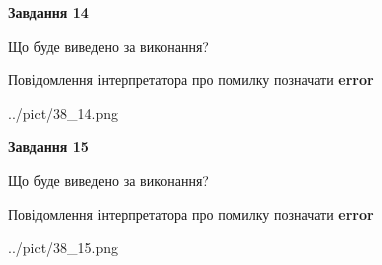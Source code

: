 \documentclass[11pt, ukrainian]{article}
\begin{document}
{\begin {large}
{\begin {center}\textbf{Завдання 14}\end {center}}\par
Що буде виведено за виконання? \par
Повідомлення інтерпретатора про помилку позначати \textbf{error}

\begin{center}
	{../pict/38_14.png}
\end{center}
\newpage

{\begin {center}\textbf{Завдання 15}\end {center}}\par
Що буде виведено за виконання? \par
Повідомлення інтерпретатора про помилку позначати \textbf{error}

\begin{center}
	{../pict/38_15.png}
\end{center}
\newpage

\end {large}}
\end{document}
